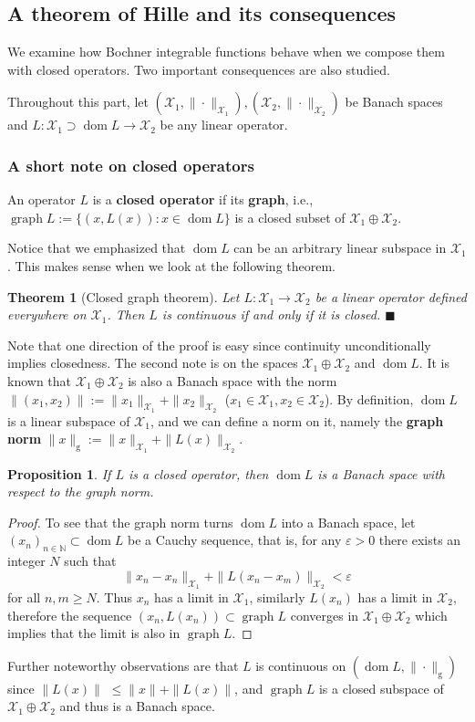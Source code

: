 \documentclass[a4paper, 12pt]{article}
\newtheorem{theo}[lem]{Theorem}
\newtheorem{state}[lem]{Proposition}
\newcommand{\graph}{\mathop{\mathrm{graph}}}
\newcommand{\dom}{\mathop{\mathrm{dom}}}
\newcommand*{\qedb}{\hfill\ensuremath{\blacksquare}}
\begin{document}
\subsection{A theorem of Hille and its consequences}
We examine how Bochner integrable functions behave when we compose them with closed operators. Two important consequences are also studied.  

Throughout this part, let $(\mathcal{X}_1, \| \cdot \|_{\mathcal{X}_1}), (\mathcal{X}_2, \| \cdot \|_{\mathcal{X}_2})$ be Banach spaces and $L \colon \mathcal{X}_1 \supset \dom{L} \rightarrow \mathcal{X}_2$ be any linear operator.
\subsubsection*{A short note on closed operators}
An operator $L$ is a \textbf{closed operator} if its \textbf{graph}, i.e., $\graph L := \lbrace (x,L(x)) :  x \in \dom{L} \rbrace$ is a closed subset of $\mathcal{X}_1 \oplus \mathcal{X}_2$.

Notice that we emphasized that $\dom{L}$ can be an arbitrary linear subspace in $\mathcal{X}_1$. This makes sense when we look at the following theorem.
\begin{theo}[Closed graph theorem]\label{theo:closed-graph} Let $L \colon \mathcal{X}_1 \rightarrow \mathcal{X}_2$ be a linear operator defined everywhere on $\mathcal{X}_1$. Then $L$ is continuous if and only if it is closed. \qedb
\end{theo}
Note that one direction of the proof is easy since continuity unconditionally implies closedness. The second note is on the spaces $\mathcal{X}_1 \oplus \mathcal{X}_2$ and $\dom{L}$. It is known that $\mathcal{X}_1 \oplus \mathcal{X}_2$ is also a Banach space with the norm $\| (x_1,x_2) \| := \| x_1 \|_{\mathcal{X}_1} + \| x_2 \|_{\mathcal{X}_2}$ ($x_1 \in \mathcal{X}_1, x_2 \in \mathcal{X}_2$). By definition, $\dom{L}$ is a linear subspace of $\mathcal{X}_1$, and we can define a norm on it, namely the \textbf{graph norm} $\| x \|_{\mathrm{g}} := \|x\|_{\mathcal{X}_1} + \| L(x) \|_{\mathcal{X}_2}$.
\begin{state} If $L$ is a closed operator, then $\dom{L}$ is a Banach space with respect to the graph norm.
\end{state}
\begin{proof}
To see that the graph norm turns $\dom{L}$ into a Banach space, let $(x_n)_{n \in \mathbb{N}} \subset \dom{L}$ be a Cauchy sequence, that is, for any $\varepsilon > 0$ there exists an integer $N$ such that
$$\| x_n - x_n \|_{\mathcal{X}_1} + \| L(x_n - x_m) \|_{\mathcal{X}_2} < \varepsilon$$
for all $n,m \geqslant N$. Thus $x_n$ has a limit in $\mathcal{X}_1$, similarly $L(x_n)$ has a limit in $\mathcal{X}_2$, therefore the sequence $(x_n, L(x_n)) \subset  \graph{L}$ converges in $\mathcal{X}_1 \oplus \mathcal{X}_2$ which implies that the limit is also in $\graph{L}$.
\end{proof}
Further noteworthy observations are that $L$ is continuous on $(\dom{L},\| \cdot \|_{\mathrm{g}})$ since $\| L(x) \|$ $\leqslant \| x \| + \| L(x) \|$, and $\graph{L}$ is a closed subspace of $\mathcal{X}_1 \oplus \mathcal{X}_2$ and thus is a Banach space.
\end{document}
